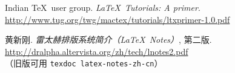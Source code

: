 \begin{thebibliography}{20}
 Indian \TeX\ user group.
  \newblock \emph{\LaTeX\ Tutorials: A primer}. \\
  \url{http://www.tug.org/twg/mactex/tutorials/ltxprimer-1.0.pdf}

 黄新刚.
  \newblock \emph{雷太赫排版系统简介（\LaTeX\ Notes）}, 第二版. \\
  \url{http://dralpha.altervista.org/zh/tech/lnotes2.pdf} \\
  （旧版可用 \texttt{texdoc latex-notes-zh-cn}）

\end{thebibliography}

\endinput